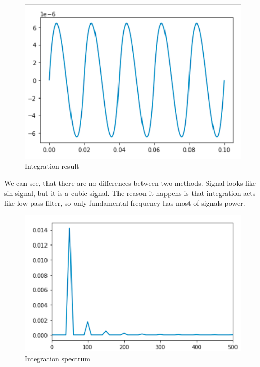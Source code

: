 \documentclass[a4paper]{article}
\begin{document}
        \begin{figure}[H]
            \centering
            \includegraphics[width=\textwidth]{img/p4_3.png}
            \caption{Integration result}
            \label{fig:part1_1_2}
        \end{figure}
        
        We can see, that there are no differences between two methods. Signal looks like sin signal, but it is a cubic signal. The reason it happens is that integration acts like low pass filter, so only fundamental frequency has most of signals power.
        
        \begin{figure}[H]
            \centering
            \includegraphics[width=\textwidth]{img/p4_4.png}
            \caption{Integration spectrum}
            \label{fig:part1_1_2}
        \end{figure}
        
\end{document}
